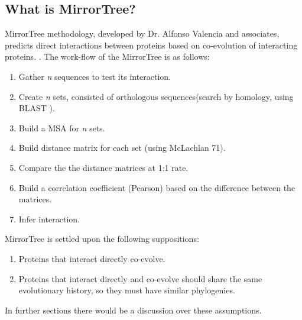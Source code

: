 \documentclass[11pt]{article}
\begin{document}
\subsection{What is MirrorTree?}
MirrorTree methodology, developed by Dr. Alfonso Valencia and associates, predicts direct interactions between proteins based on co-evolution of interacting proteins. \cite{Pazos2001}. The work-flow of the MirrorTree is as follows:
\begin{enumerate}
\setlength{\itemsep}{1pt}
	\item Gather \textit{n} sequences to test its interaction.
	\item Create \textit{n} sets, consisted of orthologous sequences(search by homology, using BLAST \cite{BLAST}).
	\item Build a MSA for \textit{n} sets.
	\item Build distance matrix for each set (using McLachlan 71).
	\item Compare the the distance matrices at 1:1 rate.
	\item Build a correlation coefficient (Pearson) based on the difference between the matrices.
	\item Infer interaction.
\end{enumerate}
MirrorTree is settled upon the following suppositions:
\begin{enumerate}
\setlength{\itemsep}{1pt}
	\item Proteins that interact directly co-evolve.
	\item Proteins that interact directly and co-evolve should share the same evolutionary history, so they must have similar phylogenies.
\end{enumerate}
In further sections there would be a discussion over these assumptions.
\end{document}
